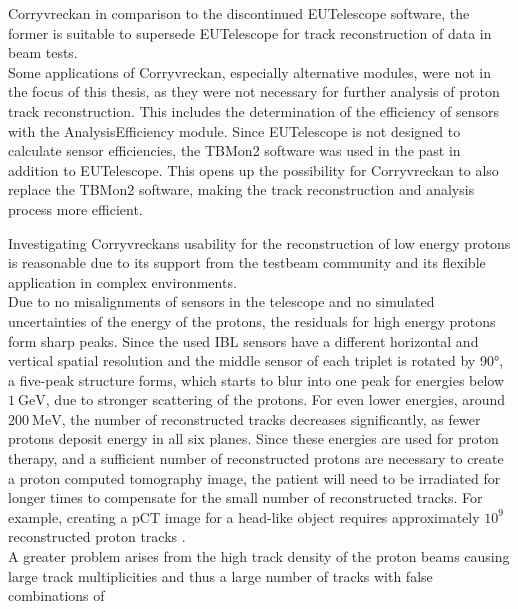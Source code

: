 Corryvreckan in comparison to the discontinued EUTelescope software, the former is suitable to supersede EUTelescope for track reconstruction of data in beam tests. \\
Some applications of Corryvreckan, especially alternative modules, were not in the focus of this thesis,
as they were not necessary for further analysis of proton track reconstruction. This includes the determination of the
efficiency of sensors with the AnalysisEfficiency module. Since EUTelescope is not designed to calculate sensor efficiencies,
the TBMon2 software \cite{tbmon} was used in the past in addition
to EUTelescope. This opens up the possibility for Corryvreckan to also replace the TBMon2 software, making the track reconstruction and analysis process more efficient.

Investigating Corryvreckans usability for the reconstruction of low energy protons is reasonable due to its support from the testbeam community and
its flexible application in complex environments. \\
Due to no misalignments of sensors in the telescope and no simulated uncertainties
of the energy of the protons, the residuals for high energy protons form sharp peaks. Since the used IBL sensors have a different
horizontal and vertical spatial resolution and the middle sensor of each triplet is rotated by 90°, a five-peak structure
forms, which starts to blur into one peak for energies below $\SI{1}{\giga\eV}$, due to stronger scattering of the protons. For even lower energies,
around $\SI{200}{\mega\eV}$, the number of reconstructed tracks decreases significantly, as fewer protons deposit energy in all six planes. Since these energies are
used for proton therapy, and a sufficient number of reconstructed protons are necessary to create a proton computed tomography image, the patient
will need to be irradiated for longer times to compensate for the small number of reconstructed tracks. For example, creating a pCT image for a head-like object requires approximately $10^9$ reconstructed proton tracks \cite{number_protons}. \\
A greater problem arises from the high track density of the proton beams causing large track multiplicities and thus a large number of tracks with false combinations of
